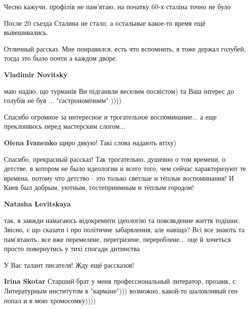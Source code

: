 \begin{itemize}
\begin{itemize}
Чесно кажучи, профілів не пам'ятаю, на початку 60-х сталіна точно не було

После 20 съезда Сталина не стало, а остальные какое-то время ещё вывешивались.

\end{itemize} %


Отличный рассказ. Мне понравился, есть что вспомнить, я тоже держал голубей,
тогда это было почти а каждом дворе.

\begin{itemize} %
\textbf{Vladimir Novitsky} 

маю надію, що турманів Ви підганяли веселим посвістом) та Ваш інтерес до
голубів не був ... "гастрономічним" ))))

\end{itemize} %


Спасибо огромное за интересное и трогательное воспоминание... а еще преклоняюсь
перед мастерским слогом...

\begin{itemize} %
\textbf{Olena Ivanenko} щиро дякую! Такі слова надають втіху)
\end{itemize} %


Спасибо, прекрасный рассказ! Так трогательно, душевно о том времени, о детстве,
в котором не было идеологии и всего того, чем сейчас характеризуют те времена,
потому что детство - это только светлые и тёплые воспоминания! И Киев был
добрым, уютным, гостеприимным и тёплым городом!

\begin{itemize} %
\textbf{Natasha Levitskaya} 

так, я завжди намагаюсь відокремити ідеологію та повсякденне життя тодішнє.
Звісно, є що сказати і про політичне забарвлення, але навіщо? Всі все знають та
пам'ятають, все вже перемелене, перегризене, перероблене... оце й хочеться
просто повернутись у тихі спогади дитинства

\end{itemize} %

У Вас талант писателя! Жду ещё рассказов!

\begin{itemize} %
\textbf{Irina Skotar} Старший брат у меня профессиональный литератор, прозаик, с Литературным институтом в "кармане"))) возможно, какой-то шаловливый ген попал и в мою хромосомку))))


\end{itemize}
\end{itemize}
